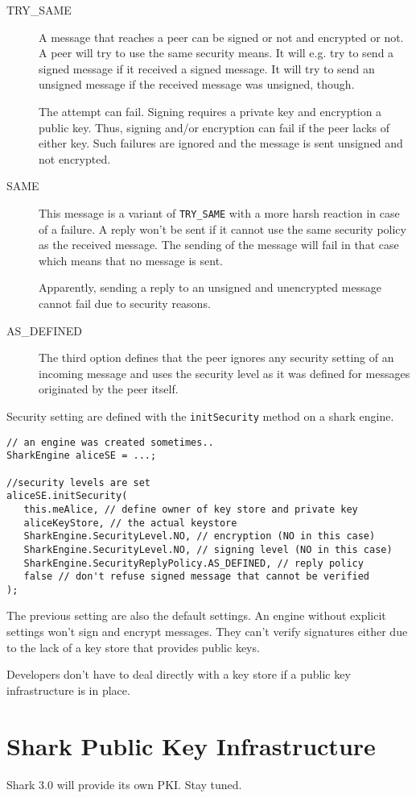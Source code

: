 \begin{description}
    \item[TRY\_SAME] A message that reaches a peer can be signed or not and encrypted or not.  A peer will try to use the same security means. It will e.g. try to send a signed message if it received a signed message. It will try to send an unsigned message if the received message was unsigned, though.

The attempt can fail. Signing requires a private key and encryption a public key. Thus, signing and/or encryption can fail if the peer lacks of either key. Such failures are ignored and the message is sent unsigned and not encrypted.

    \item[SAME] This message is a variant of {\tt TRY\_SAME} with a more harsh reaction in case of a failure. A reply won't be sent if it cannot use the same security policy as the received message. The sending of the message will fail in that case which means that no message is sent.

Apparently, sending a reply to an unsigned and unencrypted message cannot fail due to security reasons.

    \item[AS\_DEFINED] The third option defines that the peer ignores any security setting of an incoming message and uses the security level as it was defined for messages originated by the peer itself.

\end{description}

Security setting are defined with the {\tt initSecurity} method on a shark engine.

\begin{verbatim}
// an engine was created sometimes..
SharkEngine aliceSE = ...;

//security levels are set
aliceSE.initSecurity(
   this.meAlice, // define owner of key store and private key
   aliceKeyStore, // the actual keystore
   SharkEngine.SecurityLevel.NO, // encryption (NO in this case)
   SharkEngine.SecurityLevel.NO, // signing level (NO in this case) 
   SharkEngine.SecurityReplyPolicy.AS_DEFINED, // reply policy
   false // don't refuse signed message that cannot be verified
);
\end{verbatim}

The previous setting are also the default settings. An engine without explicit settings won't sign and encrypt messages. They can't verify signatures either due to the lack of a key store that provides public keys.

Developers don't have to deal directly with a key store if a public key infrastructure is in place.

\section{Shark Public Key Infrastructure}
Shark 3.0 will provide its own PKI. Stay tuned.


